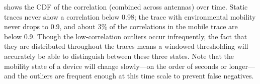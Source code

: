  shows the CDF of the correlation (combined across antennas) over time. Static traces never show a correlation below 0.98; the trace with environmental mobility never drops to 0.9, and about 3\% of the correlations in the mobile trace are below 0.9. Though the low-correlation outliers occur infrequently, the fact that they are distributed throughout the traces means a windowed thresholding will accurately be able to distinguish between these three states. Note that the mobility state of a device will change slowly---on the order of seconds or longer---and the outliers are frequent enough at this time scale to prevent false negatives.


